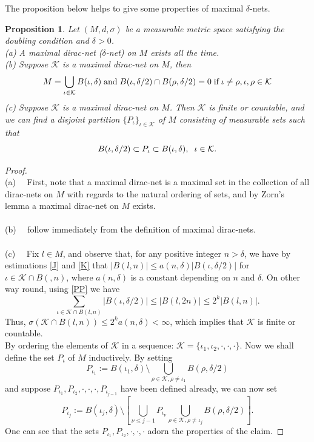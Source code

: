 \documentclass[10pt]{article}
\newtheorem{prop}[thm]{Proposition}
\theoremstyle{definition}
\numberwithin{equation}{section}
\begin{document}
	The proposition below helps to give some properties of maximal $\delta$-nets.\\
	\begin{prop}\label{B} Let $(M,d,\sigma)$ be a measurable metric space satisfying the doubling condition and  $\delta>0$.\\
		(a) A maximal dirac-net ($\delta$-net) on $M$ exists all the time.\\
		(b) Suppose $\mathcal{K}$ is a maximal dirac-net on $M$, then
		\begin{equation}\label{PP}
			M =\bigcup_{\iota \in \mathcal{K}} B(\iota, \delta)\; \hbox{and} \; B(\iota, \delta /2) \cap B(\rho, \delta /2) =0 \; \hbox{if} \; \iota \neq \rho, \iota, \rho \in \mathcal{K}
		\end{equation}
		(c) Suppose $\mathcal{K}$ is a maximal dirac-net on $M$. Then $\mathcal{K}$ is finite or countable, and we can find a disjoint partition $\{P_{\iota}\}_{\iota \in \mathcal{K}}$ of $M$ consisting of measurable sets such that
		\begin{equation}
			B(\iota, \delta /2) \subset P_{\iota} \subset B(\iota, \delta), \hspace{0.2 cm} \iota \in \mathcal{K}.
		\end{equation}
	\end{prop}
	\begin{proof}
		\ \\
		\normalfont
(a)~~ First, note that a maximal dirac-net is a maximal set in the collection of all dirac-nets on $M$ with regards to the natural ordering of sets, and by Zorn's lemma a maximal dirac-net on $M$ exists.\\
		\\
(b)~~ follow immediately from the definition of maximal dirac-nets.\\
		\\
(c)~~ Fix $l \in M$, and observe that, for any positive integer $n > \delta$, we have by estimations \eqref{J} and \eqref{K} that $|B(l,n)| \leq a(n, \delta)|B(\iota, \delta /2)|$ for $\iota \in \mathcal{K} \cap B(,n)$, where $a(n, \delta)$ is a constant depending on $n$ and $\delta$. On other way round, using \eqref{PP} we have\\
		$$ \sum_{\iota \in \mathcal{K} \cap B(l,n)} |B(\iota, \delta /2)| \leq |B(l, 2n)| \leq 2^k |B(l,n)|.$$
		Thus, $ \sigma(\mathcal{K} \cap B(l, n)) \leq 2^k a(n, \delta) < \infty $, which implies that $ \mathcal{K} $ is finite or countable.\\
		By ordering the elements of $\mathcal{K}$ in a sequence: $ \mathcal{K}= \{\iota_1, \iota_2, \cdotp,\cdotp,\cdotp\}$. Now we shall define the set $P_{\iota}$ of $M$ inductively. By setting
		$$ P_{\iota_1} := B(\iota_1, \delta) \setminus \bigcup_{\rho \in \mathcal{K}, \rho \neq \iota_1} B(\rho, \delta/2)$$
		and suppose $ P_{\iota_1}, P_{\iota_2}, \cdot, \cdot, \cdot, P_{\iota_{j-1}} $ have been defined already, we can now set
		$$P_{\iota_j} := B(\iota_j, \delta) \setminus \left[\bigcup_{\nu \leq j-1} P_{\iota_{\nu}} \bigcup_{\rho \in \mathcal{K}, \rho \neq \iota_j} B( \rho, \delta/2)\right].$$
		One can see that the sets $ P_{\iota_1}, P_{\iota_2}, \cdot, \cdot, \cdot $ adorn the properties of the claim.
	\end{proof}
\end{document}
